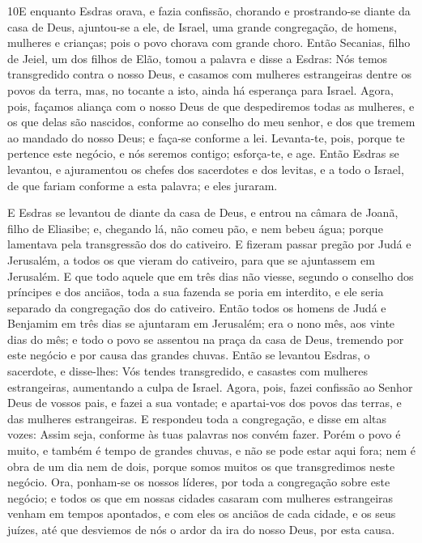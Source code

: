 \lettrine{10} E enquanto Esdras orava, e fazia confissão,
chorando e prostrando-se diante da casa de Deus, ajuntou-se a ele,
de Israel, uma grande congregação, de homens, mulheres e crianças;
pois o povo chorava com grande choro. Então Secanias, filho de
Jeiel, um dos filhos de Elão, tomou a palavra e disse a Esdras: Nós
temos transgredido contra o nosso Deus, e casamos com mulheres
estrangeiras dentre os povos da terra, mas, no tocante a isto, ainda
há esperança para Israel. Agora, pois, façamos aliança com o
nosso Deus de que despediremos todas as mulheres, e os que delas são
nascidos, conforme ao conselho do meu senhor, e dos que tremem ao
mandado do nosso Deus; e faça-se conforme a lei. Levanta-te,
pois, porque te pertence este negócio, e nós seremos contigo;
esforça-te, e age. Então Esdras se levantou, e ajuramentou os
chefes dos sacerdotes e dos levitas, e a todo o Israel, de que
fariam conforme a esta palavra; e eles juraram.

E Esdras se levantou de diante da casa de Deus, e entrou na câmara
de Joanã, filho de Eliasibe; e, chegando lá, não comeu pão, e nem
bebeu água; porque lamentava pela transgressão dos do cativeiro.
E fizeram passar pregão por Judá e Jerusalém, a todos os que
vieram do cativeiro, para que se ajuntassem em Jerusalém. E que
todo aquele que em três dias não viesse, segundo o conselho dos
príncipes e dos anciãos, toda a sua fazenda se poria em interdito, e
ele seria separado da congregação dos do cativeiro. Então todos
os homens de Judá e Benjamim em três dias se ajuntaram em Jerusalém;
era o nono mês, aos vinte dias do mês; e todo o povo se assentou na
praça da casa de Deus, tremendo por este negócio e por causa das
grandes chuvas. Então se levantou Esdras, o sacerdote, e
disse-lhes: Vós tendes transgredido, e casastes com mulheres
estrangeiras, aumentando a culpa de Israel. Agora, pois,
fazei confissão ao Senhor Deus de vossos pais, e fazei a sua
vontade; e apartai-vos dos povos das terras, e das mulheres
estrangeiras. E respondeu toda a congregação, e disse em
altas vozes: Assim seja, conforme às tuas palavras nos convém fazer.
Porém o povo é muito, e também é tempo de grandes chuvas, e
não se pode estar aqui fora; nem é obra de um dia nem de dois,
porque somos muitos os que transgredimos neste negócio. Ora,
ponham-se os nossos líderes, por toda a congregação sobre este
negócio; e todos os que em nossas cidades casaram com mulheres
estrangeiras venham em tempos apontados, e com eles os anciãos de
cada cidade, e os seus juízes, até que desviemos de nós o ardor da
ira do nosso Deus, por esta causa.

